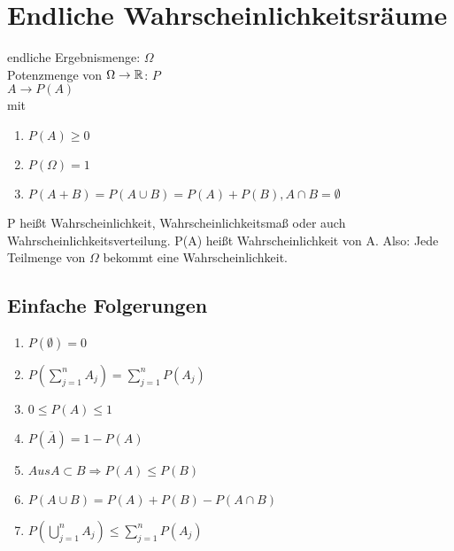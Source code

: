 \section{Endliche Wahrscheinlichkeitsräume}
endliche Ergebnismenge: $ \Omega $\\
Potenzmenge von $ \Omega \rightarrow \mathbb{R}$: $ P $\\
$ A \rightarrow P(A) $\\
mit\\
\begin{enumerate}
\item $ P(A)  \geq 0 $
\item $ P(\Omega) = 1 $
\item $ P(A+B)=P(A\cup B) = P(A) + P(B), A\cap B=\emptyset $
\end{enumerate}
P heißt Wahrscheinlichkeit, Wahrscheinlichkeitsmaß oder auch Wahrscheinlichkeitsverteilung. P(A) heißt Wahrscheinlichkeit von A. Also: Jede Teilmenge von $ \Omega $ bekommt eine Wahrscheinlichkeit. 

\subsection{Einfache Folgerungen}

\begin{enumerate}
\item $ P(\emptyset) = 0 $
\item $ P(\sum_{j=1}^{n} A_j) = \sum_{j=1}^{n} P(A_j) $ 
\item $ 0\leq P(A)\leq 1 $ 
\item $ P(\overline{A}) = 1-P(A) $ 
\item $ Aus A\subset B \Rightarrow P(A)\leq P(B) $ 
\item $ P(A\cup B) = P(A)+P(B) - P(A\cap B) $ 
\item $ P(\bigcup_{j=1}^n A_j) \leq \sum_{j=1}^{n} P(A_j) $ 
\end{enumerate}

